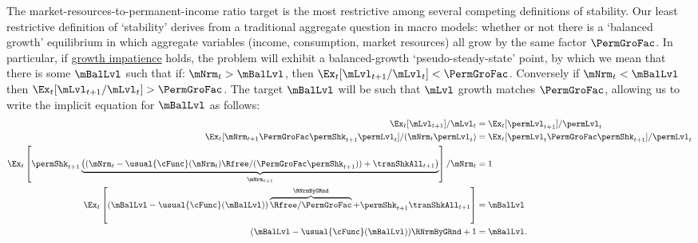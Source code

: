 \documentclass[BufferStockTheory]{subfiles}
\begin{document}
\hypertarget{Collective-Stability}{}
\hypertarget{pseudo-steady-state}{}

The market-resources-to-permanent-income ratio target is the most restrictive among several competing definitions of stability.
Our least restrictive definition of `stability' derives from a traditional aggregate question in macro models: whether or not there is a `balanced growth' equilibrium in which aggregate variables (income, consumption, market resources) all grow by the same factor $\PermGroFac$.
In particular, if \hyperlink{GIC}{growth impatience} holds, the problem will exhibit a balanced-growth `pseudo-steady-state' point, by which we mean that there is some ${\mBalLvl}$ such that if:
\hypertarget{balgrostable}{}
\hypertarget{balgrostableSolve}{}
$\mNrm_{t}>{\mBalLvl}$, then $\Ex_{t}[\mLvl_{t+1}/\mLvl_{t}] < \PermGroFac$.
Conversely if $\mNrm_{t}<{\mBalLvl}$ then $\Ex_{t}[\mLvl_{t+1}/\mLvl_{t}] > \PermGroFac$.
The target $\mBalLvl$ will be such that $\mLvl$ growth matches $\PermGroFac$, allowing us to write the implicit equation for $\mBalLvl$ as follows:
%
%
\begin{equation}\label{eq:balgrostable}
  \begin{split}
    \Ex_{t}[\mLvl_{t+1}]/\mLvl_{t} & =\Ex_{t}[\permLvl_{t+1}]/\permLvl_{t}
    \\  \Ex_{t}[\mNrm_{t+1}\PermGroFac\permShk_{t+1}\permLvl_{t}]/(\mNrm_{t}\permLvl_{t}) & =\Ex_{t}[\permLvl_{t}\PermGroFac\permShk_{t+1}]/\permLvl_{t}
    \\ \Ex_{t}\left[\permShk_{t+1}\underbrace{\left((\mNrm_{t}-\usual{\cFunc}(\mNrm_{t})\Rfree/(\PermGroFac\permShk_{t+1}))+\tranShkAll_{t+1}\right)}_{\mNrm_{t+1}}\right]/\mNrm_{t} & = 1
    \\ 
    \Ex_{t}\left[(\mBalLvl-\usual{\cFunc}(\mBalLvl))\overbrace{\Rfree/\PermGroFac}^{\RNrmByGRnd}+\permShk_{t+1}\tranShkAll_{t+1}\right] & = \mBalLvl
    \\  (\mBalLvl-\usual{\cFunc}(\mBalLvl))\RNrmByGRnd+ 1 & = \mBalLvl .
  \end{split}
\end{equation}
\end{document}
